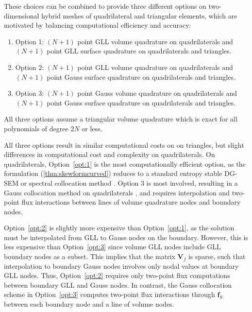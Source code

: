 \documentclass{svjour3}                     %
\begin{document}
These choices can be combined to provide three different options on two-dimensional hybrid meshes of quadrilateral and triangular elements, which are motivated by balancing computational efficiency and accuracy:
\begin{enumerate}
\item Option 1: $(N+1)$ point GLL volume quadrature on quadrilaterals and $(N+1)$ point GLL surface quadrature on quadrilaterals and triangles.\label{opt:1}
\item Option 2: $(N+1)$ point GLL volume quadrature on quadrilaterals and $(N+1)$ point Gauss surface quadrature on quadrilaterals and triangles.\label{opt:2}
\item Option 3: $(N+1)$ point Gauss volume quadrature on quadrilaterals and $(N+1)$ point Gauss surface quadrature on quadrilaterals and triangles.\label{opt:3}
\end{enumerate}
All three options assume a triangular volume quadrature which is exact for all polynomials of degree $2N$ or less.  

All three options result in similar computational costs on on triangles, but slight differences in computational cost and complexity on quadrilaterals.  On quadrilaterals, Option~\ref{opt:1} is the most computationally efficient option, as the formulation (\ref{thm:skewformcurved}) reduces to a standard entropy stable DG-SEM \cite{gassner2016split} or spectral collocation method \cite{carpenter2014entropy}.  Option 3 is most involved, resulting in a Gauss collocation method on quadrilaterals \cite{chan2018efficient}, and requires interpolation and two-point flux interactions between lines of volume quadrature nodes and boundary nodes.  %

Option~\ref{opt:2} is slightly more expensive than Option~\ref{opt:1}, as the solution must be interpolated from GLL to Gauss nodes on the boundary.  However, this is less expensive than Option~\ref{opt:3} since volume GLL nodes include GLL boundary nodes as a subset.  This implies that the matrix $\bm{V}_f$ is sparse, such that interpolation to boundary Gauss nodes involves only nodal values at boundary GLL nodes.  Thus, Option~\ref{opt:2} requires only two-point flux computations between boundary GLL and Gauss nodes.  In contrast, the Gauss collocation scheme in Option~\ref{opt:3} computes two-point flux interactions through $\bm{f}_S$ between each boundary node and a line of volume nodes.  
\end{document}
